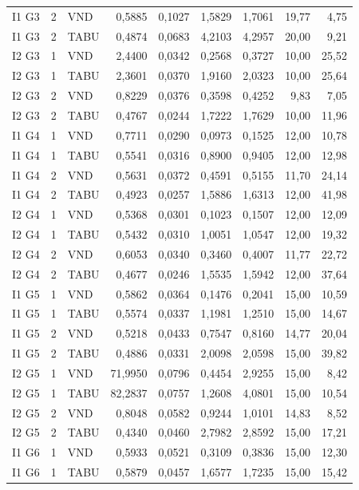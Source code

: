 \begin{longtable}{lrlrrrrrr}
I1 G3 & 2 & VND & 0,5885 & 0,1027 & 1,5829 & 1,7061 & 19,77 & 4,75 \\
I1 G3 & 2 & TABU & 0,4874 & 0,0683 & 4,2103 & 4,2957 & 20,00 & 9,21 \\
I2 G3 & 1 & VND & 2,4400 & 0,0342 & 0,2568 & 0,3727 & 10,00 & 25,52 \\
I2 G3 & 1 & TABU & 2,3601 & 0,0370 & 1,9160 & 2,0323 & 10,00 & 25,64 \\
I2 G3 & 2 & VND & 0,8229 & 0,0376 & 0,3598 & 0,4252 & 9,83 & 7,05 \\
I2 G3 & 2 & TABU & 0,4767 & 0,0244 & 1,7222 & 1,7629 & 10,00 & 11,96 \\
I1 G4 & 1 & VND & 0,7711 & 0,0290 & 0,0973 & 0,1525 & 12,00 & 10,78 \\
I1 G4 & 1 & TABU & 0,5541 & 0,0316 & 0,8900 & 0,9405 & 12,00 & 12,98 \\
I1 G4 & 2 & VND & 0,5631 & 0,0372 & 0,4591 & 0,5155 & 11,70 & 24,14 \\
I1 G4 & 2 & TABU & 0,4923 & 0,0257 & 1,5886 & 1,6313 & 12,00 & 41,98 \\
I2 G4 & 1 & VND & 0,5368 & 0,0301 & 0,1023 & 0,1507 & 12,00 & 12,09 \\
I2 G4 & 1 & TABU & 0,5432 & 0,0310 & 1,0051 & 1,0547 & 12,00 & 19,32 \\
I2 G4 & 2 & VND & 0,6053 & 0,0340 & 0,3460 & 0,4007 & 11,77 & 22,72 \\
I2 G4 & 2 & TABU & 0,4677 & 0,0246 & 1,5535 & 1,5942 & 12,00 & 37,64 \\
I1 G5 & 1 & VND & 0,5862 & 0,0364 & 0,1476 & 0,2041 & 15,00 & 10,59 \\
I1 G5 & 1 & TABU & 0,5574 & 0,0337 & 1,1981 & 1,2510 & 15,00 & 14,67 \\
I1 G5 & 2 & VND & 0,5218 & 0,0433 & 0,7547 & 0,8160 & 14,77 & 20,04 \\
I1 G5 & 2 & TABU & 0,4886 & 0,0331 & 2,0098 & 2,0598 & 15,00 & 39,82 \\
I2 G5 & 1 & VND & 71,9950 & 0,0796 & 0,4454 & 2,9255 & 15,00 & 8,42 \\
I2 G5 & 1 & TABU & 82,2837 & 0,0757 & 1,2608 & 4,0801 & 15,00 & 10,54 \\
I2 G5 & 2 & VND & 0,8048 & 0,0582 & 0,9244 & 1,0101 & 14,83 & 8,52 \\
I2 G5 & 2 & TABU & 0,4340 & 0,0460 & 2,7982 & 2,8592 & 15,00 & 17,21 \\
I1 G6 & 1 & VND & 0,5933 & 0,0521 & 0,3109 & 0,3836 & 15,00 & 12,30 \\
I1 G6 & 1 & TABU & 0,5879 & 0,0457 & 1,6577 & 1,7235 & 15,00 & 15,42 \\

\end{longtable}
